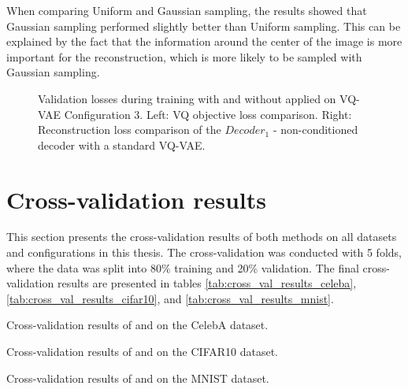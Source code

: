 When comparing Uniform and Gaussian sampling, the results showed that Gaussian sampling performed slightly better than Uniform sampling. This can be explained by the fact that the information around the center of the image is more important for the reconstruction, which is more likely to be sampled with Gaussian sampling.

\begin{figure}[H]
    \centering
    \scalebox{0.48}{}
    \scalebox{0.48}{}
    \caption[Validation loss comparison during training of a VQ-VAE.]
    {
        Validation losses during training with and without  applied on VQ-VAE Configuration 3.
        Left: VQ objective loss comparison. Right: Reconstruction loss comparison of the $Decoder_1$ - non-conditioned decoder with a standard VQ-VAE.
    }
    \label{fig:results_method2_vq_vae}
\end{figure}

\section{Cross-validation results} \label{sec:cross_val_results}

This section presents the cross-validation results of both methods on all datasets and configurations in this thesis. The cross-validation was conducted with 5 folds, where the data was split into 80\% training and 20\% validation. The final cross-validation results are presented in tables \ref{tab:cross_val_results_celeba}, \ref{tab:cross_val_results_cifar10}, and \ref{tab:cross_val_results_mnist}.

\begin{table}[H]
    
    \caption{Cross-validation results of  and  on the CelebA dataset.}
    \label{tab:cross_val_results_celeba}
\end{table}
\begin{table}
    
    \caption{Cross-validation results of  and  on the CIFAR10 dataset.}
    \label{tab:cross_val_results_cifar10}
\end{table}

\begin{table}
    
    \caption{Cross-validation results of  and  on the MNIST dataset.}
    \label{tab:cross_val_results_mnist}
\end{table}